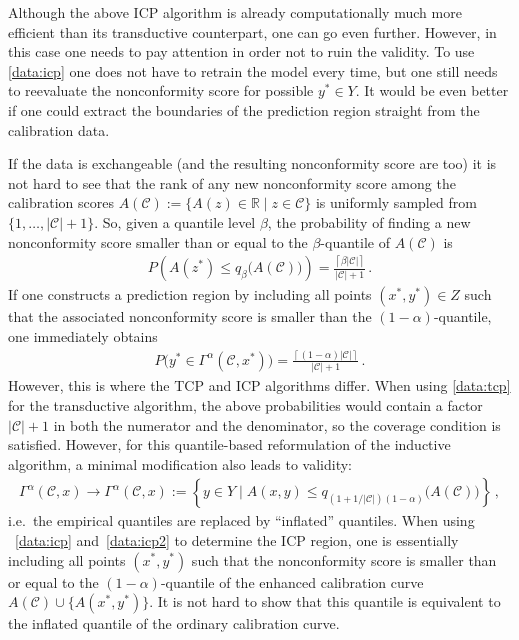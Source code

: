     \begin{property}[Validity]
        Although the above ICP algorithm is already computationally much more efficient than its transductive counterpart, one can go even further. However, in this case one needs to pay attention in order not to ruin the validity. To use \cref{data:icp} one does not have to retrain the model every time, but one still needs to reevaluate the nonconformity score for possible $y^*\in Y$. It would be even better if one could extract the boundaries of the prediction region straight from the calibration data.

        If the data is exchangeable (and the resulting nonconformity score are too) it is not hard to see that the rank of any new nonconformity score among the calibration scores $A(\mathcal{C}):=\{A(z)\in\mathbb{R}\mid z\in\mathcal{C}\}$ is uniformly sampled from $\{1,\ldots,|\mathcal{C}|+1\}$. So, given a quantile level $\beta$, the probability of finding a new nonconformity score smaller than or equal to the $\beta$-quantile of $A(\mathcal{C})$ is
        \begin{gather}
            P\left(A(z^*)\leq q_\beta\bigl(A(\mathcal{C})\bigr)\right) = \frac{\left\lceil\beta|\mathcal{C}|\right\rceil}{|\mathcal{C}|+1}\,.
        \end{gather}
        If one constructs a prediction region by including all points $(x^*,y^*)\in Z$ such that the associated nonconformity score is smaller than the $(1-\alpha)$-quantile, one immediately obtains
        \begin{gather}
            P\bigl(y^*\in\Gamma^\alpha(\mathcal{C},x^*)\bigr) = \frac{\left\lceil(1-\alpha)|\mathcal{C}|\right\rceil}{|\mathcal{C}|+1}\,.
        \end{gather}
        However, this is where the TCP and ICP algorithms differ. When using \cref{data:tcp} for the transductive algorithm, the above probabilities would contain a factor $|\mathcal{C}|+1$ in both the numerator and the denominator, so the coverage condition is satisfied. However, for this quantile-based reformulation of the inductive algorithm, a minimal modification also leads to validity:
        \begin{gather}
            \Gamma^\alpha(\mathcal{C},x)\longrightarrow\Gamma^\alpha(\mathcal{C},x) := \left\{y\in Y\mid A(x,y)\leq q_{(1+1/|\mathcal{C}|)(1-\alpha)}\bigl(A(\mathcal{C})\bigr)\right\}\,,
        \end{gather}
        i.e.~the empirical quantiles are replaced by ``inflated'' quantiles. When using ~\eqref{data:icp} and~\eqref{data:icp2} to determine the ICP region, one is essentially including all points $(x^*,y^*)$ such that the nonconformity score is smaller than or equal to the $(1-\alpha)$-quantile of the enhanced calibration curve $A(\mathcal{C})\cup\{A(x^*,y^*)\}$. It is not hard to show that this quantile is equivalent to the inflated quantile of the ordinary calibration curve.


\end{property}
